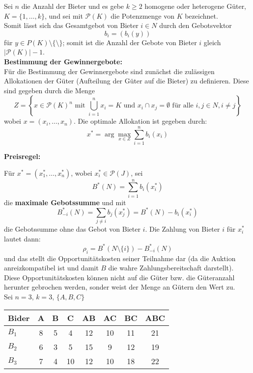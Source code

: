 \documentclass[12pt]{extreport} %
\theoremstyle{named}
\theoremstyle{itshape}
\theoremstyle{normal}
\begin{document}
Sei $n$ die Anzahl der Bieter und es gebe $k \geq 2$ homogene oder heterogene Güter, $K = \{ 1, \dotsc, k\}$, und sei mit $\mathcal{P}(K)$ die Potenzmenge von $K$ bezeichnet. ~\\

Somit lässt sich das Gesamtgebot von Bieter $i \in N$ durch den Gebotsvektor
$$ b_{i} = \left( b_{i}(y) \right) $$
für $y \in P(K) \setminus \{ \setminus \}$; somit ist die Anzahl der Gebote von Bieter $i$ gleich $\left| \mathcal{P}(K) \right| - 1$. ~\\


\textbf{Bestimmung der Gewinnergebote:} ~\\

Für die Bestimmung der Gewinnergebote sind zunächst die zulässigen Allokationen der Güter (Aufteilung der Güter auf die Bieter) zu definieren. Diese sind gegeben durch die Menge
$$Z = \left\{ x \in \mathcal{P}(K)^{n} \text{ mit } \bigcup_{i=1}^{n} x_{i} = K \text{ und } x_{i} \cap x_{j} = \emptyset \text{ für alle } i, j \in N, i \neq j \right\}$$
wobei $x = \left( x_{i}, \dotsc, x_{n} \right)$. Die optimale Allokation ist gegeben durch: 
$$x^{*} = \arg \max_{x \in Z } \sum_{i=1}^{n} b_{i}(x_{i}) $$

\textbf{Preisregel:} ~\\ 

Für $x^{*} = \left( x_1^{*}, \dotsc, x_{n}^{*} \right)$, wobei $x_{i}^{*} \in \mathcal{P}(J)$, sei
	$$ B^{*}(N) = \sum_{i=1}^{n} b_{i}(x_{i}^{*}) $$
die \textbf{maximale Gebotssumme} und mit 
	$$ B_{-i}^{*}(N) = \sum_{j \neq i} b_{j}(x_{j}^{*}) = B^{*}(N) - b_{i}(x_{i}^{*}) $$
die Gebotssumme ohne das Gebot von Bieter $i$. Die Zahlung von Bieter $i$ für $x_{i}^{*}$ lautet dann:
$$ \rho_{i} = B^{*}\left(N \setminus \{ i \} \right) - B_{-i}^{*}(N) $$
und das stellt die Opportunitätskosten seiner Teilnahme dar (da die Auktion anreizkompatibel ist und damit $B$ die wahre Zahlungsbereitschaft darstellt). Diese Opportunitätskosten können nicht auf die Güter bzw. die Güteranzahl herunter gebrochen werden, sonder weist der Menge an Gütern den Wert zu. ~\\



Sei $n=3$, $k=3$, $\{ A, B, C\}$ 

\begin{figure*}[h!] \centering
	\begin{tabular}{l|ccccccc}
  		Bider & A & B &  C & AB & AC & BC & ABC \\
  						\hline
  		$B_1$ & 8 & 5 &  4 & 12 & 10 & 11 & 21  \\
  		$B_2$ & 6 & 3 &  5 & 15 &  9 & 12 & 19  \\
  		$B_3$ & 7 & 4 & 10 & 12 & 10 & 18 & 22 
	\end{tabular}
\end{figure*}	
\end{document}
